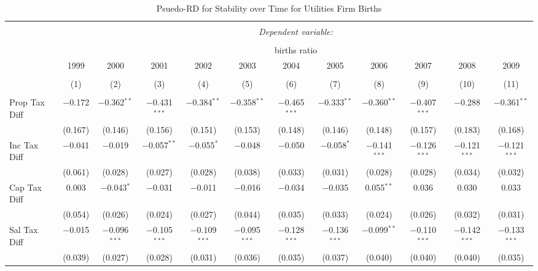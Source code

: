 
\begin{table}[!htbp] \centering 
  \caption{Psuedo-RD for Stability over Time for  Utilities Firm Births} 
  \label{22year} 
\small 
\begin{tabular}{@{\extracolsep{5pt}}lccccccccccc} 
\\[-1.8ex]\hline 
\hline \\[-1.8ex] 
 & \multicolumn{11}{c}{\textit{Dependent variable:}} \\ 
\cline{2-12} 
\\[-1.8ex] & \multicolumn{11}{c}{births ratio} \\ 
 & 1999 & 2000 & 2001 & 2002 & 2003 & 2004 & 2005 & 2006 & 2007 & 2008 & 2009 \\ 
\\[-1.8ex] & (1) & (2) & (3) & (4) & (5) & (6) & (7) & (8) & (9) & (10) & (11)\\ 
\hline \\[-1.8ex] 
 Prop Tax Diff & $-$0.172 & $-$0.362$^{**}$ & $-$0.431$^{***}$ & $-$0.384$^{**}$ & $-$0.358$^{**}$ & $-$0.465$^{***}$ & $-$0.333$^{**}$ & $-$0.360$^{**}$ & $-$0.407$^{***}$ & $-$0.288 & $-$0.361$^{**}$ \\ 
  & (0.167) & (0.146) & (0.156) & (0.151) & (0.153) & (0.148) & (0.146) & (0.148) & (0.157) & (0.183) & (0.168) \\ 
  Inc Tax Diff & $-$0.041 & $-$0.019 & $-$0.057$^{**}$ & $-$0.055$^{*}$ & $-$0.048 & $-$0.050 & $-$0.058$^{*}$ & $-$0.141$^{***}$ & $-$0.126$^{***}$ & $-$0.121$^{***}$ & $-$0.121$^{***}$ \\ 
  & (0.061) & (0.028) & (0.027) & (0.028) & (0.038) & (0.033) & (0.031) & (0.028) & (0.028) & (0.034) & (0.032) \\ 
  Cap Tax Diff & 0.003 & $-$0.043$^{*}$ & $-$0.031 & $-$0.011 & $-$0.016 & $-$0.034 & $-$0.035 & 0.055$^{**}$ & 0.036 & 0.030 & 0.033 \\ 
  & (0.054) & (0.026) & (0.024) & (0.027) & (0.044) & (0.035) & (0.033) & (0.024) & (0.026) & (0.032) & (0.031) \\ 
  Sal Tax Diff & $-$0.015 & $-$0.096$^{***}$ & $-$0.105$^{***}$ & $-$0.109$^{***}$ & $-$0.095$^{***}$ & $-$0.128$^{***}$ & $-$0.136$^{***}$ & $-$0.099$^{**}$ & $-$0.110$^{***}$ & $-$0.142$^{***}$ & $-$0.133$^{***}$ \\ 
  & (0.039) & (0.027) & (0.028) & (0.031) & (0.036) & (0.035) & (0.037) & (0.040) & (0.040) & (0.040) & (0.035) \\ 

\end{tabular}
\end{table}
